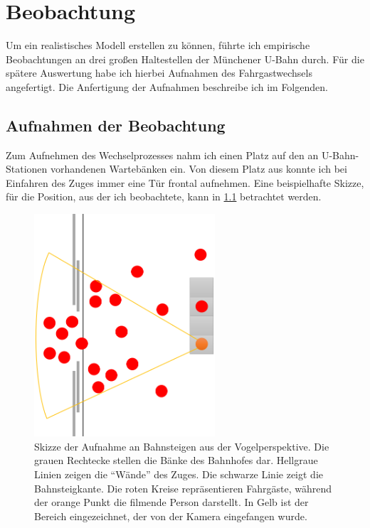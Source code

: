 \chapter{Beobachtung} \label{Beobachtung}
Um ein realistisches Modell erstellen zu können, führte ich empirische Beobachtungen an drei großen Haltestellen der Münchener U-Bahn durch. Für die spätere Auswertung habe ich hierbei Aufnahmen des Fahrgastwechsels angefertigt. Die Anfertigung der Aufnahmen beschreibe ich im Folgenden. 
\section{Aufnahmen der Beobachtung} \label{Aufnahmedetails}
Zum Aufnehmen des Wechselprozesses nahm ich einen Platz auf den an U-Bahn-Stationen vorhandenen Wartebänken ein. Von diesem Platz aus konnte ich bei Einfahren des Zuges immer eine Tür frontal aufnehmen. Eine beispielhafte Skizze, für die Position, aus der ich beobachtete, kann in \figurename \ref{fig:skizzeBeobachtung} betrachtet werden. \\
\begin{figure}[H]
	\centering
		\includegraphics[angle=270, width=0.6\textwidth]{pictures/observation/recording/example_tapping.png}
	\caption{Skizze der Aufnahme an Bahnsteigen aus der Vogelperspektive. Die grauen Rechtecke stellen die Bänke des Bahnhofes dar. Hellgraue Linien zeigen die "`Wände"' des Zuges. Die schwarze Linie zeigt die Bahnsteigkante. Die roten Kreise repräsentieren Fahrgäste, während der orange Punkt die filmende Person darstellt. In Gelb ist der Bereich eingezeichnet, der von der Kamera eingefangen wurde.}
	\label{fig:skizzeBeobachtung}
\end{figure}
